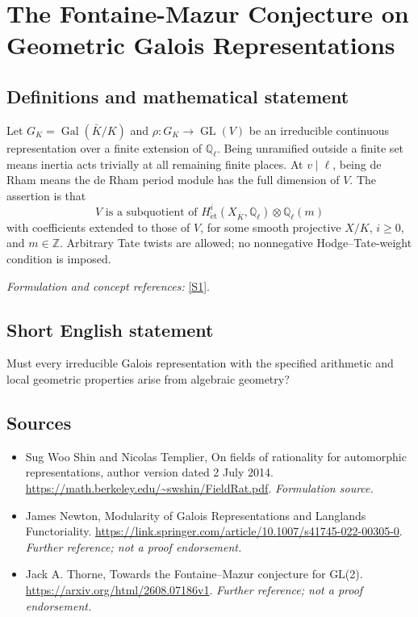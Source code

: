 \documentclass[11pt]{article}
\begin{document}
\section*{\texorpdfstring{The Fontaine-Mazur Conjecture on Geometric Galois Representations}{The Fontaine-Mazur Conjecture on Geometric Galois Representations}}\label{47}
\subsection{Definitions and mathematical statement}
Let $G_K=\operatorname{Gal}(\bar K/K)$ and $\rho:G_K\to\operatorname{GL}(V)$ be an irreducible continuous representation over a finite extension of ${\mathbb{Q}}_\ell$. Being unramified outside a finite set means inertia acts trivially at all remaining finite places. At $v\mid\ell$, being de Rham means the de Rham period module has the full dimension of $V$. The assertion is that
\[
 V\text{ is a subquotient of }H^i_{\mathrm{\acute et}}(X_{\bar K},{\mathbb{Q}}_\ell)\otimes{\mathbb{Q}}_\ell(m)
\]
with coefficients extended to those of $V$, for some smooth projective $X/K$, $i\ge0$, and $m\in{\mathbb{Z}}$. Arbitrary Tate twists are allowed; no nonnegative Hodge--Tate-weight condition is imposed.
\par\smallskip\textit{Formulation and concept references:} \href{https://math.berkeley.edu/~swshin/FieldRat.pdf}{[S1]}.

\subsection{Short English statement}
Must every irreducible Galois representation with the specified arithmetic and local geometric properties arise from algebraic geometry?
\subsection{Sources}
\begin{itemize}
\item[S1]Sug Woo Shin and Nicolas Templier, On fields of rationality for automorphic representations, author version dated 2 July 2014.
\url{https://math.berkeley.edu/~swshin/FieldRat.pdf}.
\textit{Formulation source.}
\item[S2]James Newton, Modularity of Galois Representations and Langlands Functoriality.
\url{https://link.springer.com/article/10.1007/s41745-022-00305-0}.
\textit{Further reference; not a proof endorsement.}
\item[S3]Jack A. Thorne, Towards the Fontaine–Mazur conjecture for GL(2).
\url{https://arxiv.org/html/2608.07186v1}.
\textit{Further reference; not a proof endorsement.}
\end{itemize}
\end{document}
